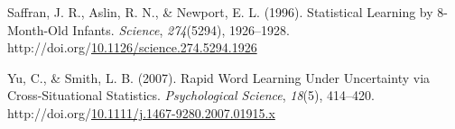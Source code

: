 \documentclass[10pt, letterpaper]{article}
\newenvironment{CSLReferences}%
  {}%
  {\par}
\begin{document}
\begin{CSLReferences}{1}{0}
\leavevmode{}%
Saffran, J. R., Aslin, R. N., \& Newport, E. L. (1996). Statistical
Learning by 8-Month-Old Infants. \emph{Science}, \emph{274}(5294),
1926--1928.
http://doi.org/\href{https://doi.org/10.1126/science.274.5294.1926}{10.1126/science.274.5294.1926}

\leavevmode{}%
Yu, C., \& Smith, L. B. (2007). Rapid Word Learning Under Uncertainty
via Cross-Situational Statistics. \emph{Psychological Science},
\emph{18}(5), 414--420.
http://doi.org/\href{https://doi.org/10.1111/j.1467-9280.2007.01915.x}{10.1111/j.1467-9280.2007.01915.x}

\end{CSLReferences}


\end{document}
